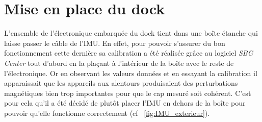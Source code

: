 \documentclass[12pt]{report}
\begin{document}
\section{Mise en place du dock}

L'ensemble de l'électronique embarquée du dock tient dans une boîte étanche qui laisse passer le câble de l'IMU. En effet, pour pouvoir s'assurer du bon fonctionnement cette dernière sa calibration a été réalisée grâce au logiciel \textit{SBG Center} tout d'abord en la plaçant à l'intérieur de la boîte avec le reste de l'électronique. Or en observant les valeurs données et en essayant la calibration il apparaissait que les appareils aux alentours produisaient des perturbations magnétiques bien trop importantes pour que le cap mesuré soit cohérent. C'est pour cela qu'il a été décidé de plutôt placer l'IMU en dehors de la boîte pour pouvoir qu'elle fonctionne correctement (cf ~\ref{fig:IMU_exterieur}).
\end{document}
